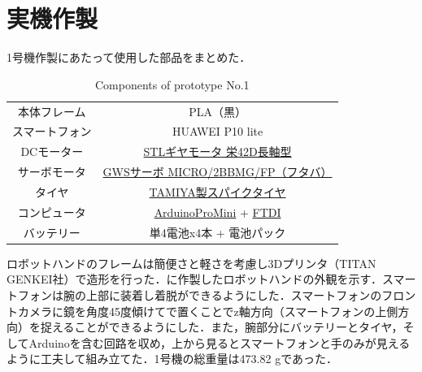 \section{実機作製}
1号機作製にあたって使用した部品をまとめた．

\begin{table}[H]
    \centering
    \caption{Components of prototype No.1}
    \begin{tabular}{cc}\toprule
        本体フレーム & PLA（黒） \\
        スマートフォン & HUAWEI P10 lite \\
        DCモーター & \href{http://akizukidenshi.com/catalog/g/gM-12379/}{STLギヤモータ 栄42D長軸型} \\
        サーボモータ & \href{http://akizukidenshi.com/catalog/g/gM-01908/}{GWSサーボ MICRO/2BBMG/FP（フタバ）} \\ 
        タイヤ & \href{https://tamiya.com/japan/products/70194/index.html}{TAMIYA製スパイクタイヤ} \\ 
        コンピュータ & \href{http://akizukidenshi.com/catalog/g/gK-10347/}{ArduinoProMini} + \href{https://www.switch-science.com/catalog/1032/}{FTDI} \\ 
        バッテリー & 単4電池x4本 + 電池パック \\
        \bottomrule
    \end{tabular} 
    \label{tab:1号機部品}
\end{table}

ロボットハンドのフレームは簡便さと軽さを考慮し3Dプリンタ（TITAN GENKEI社）で造形を行った．に作製したロボットハンドの外観を示す．スマートフォンは腕の上部に装着し着脱ができるようにした．スマートフォンのフロントカメラに鏡を角度45度傾けてで置くことでz軸方向（スマートフォンの上側方向）を捉えることができるようにした．また，腕部分にバッテリーとタイヤ，そしてArduinoを含む回路を収め，上から見るとスマートフォンと手のみが見えるように工夫して組み立てた．1号機の総重量は473.82 gであった．

